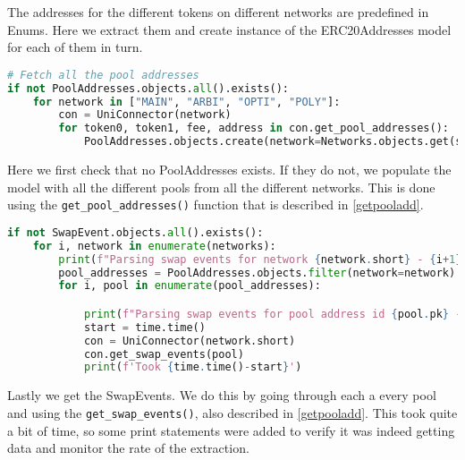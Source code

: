 The addresses for the different tokens on different networks are predefined in Enums. Here we extract them and create instance of the ERC20Addresses model for each of them in turn.


\begin{lstlisting}[language=python]
# Fetch all the pool addresses
if not PoolAddresses.objects.all().exists():
    for network in ["MAIN", "ARBI", "OPTI", "POLY"]:
        con = UniConnector(network)
        for token0, token1, fee, address in con.get_pool_addresses():
            PoolAddresses.objects.create(network=Networks.objects.get(short=network), token0=ERC20.objects.get(symbol=token0), token1=ERC20.objects.get(symbol=token1), fee_tier=fee.value, address=address)
\end{lstlisting}

Here we first check that no PoolAddresses exists. If they do not, we populate the model with all the different pools from all the different networks. This is done using the \texttt{get\_pool\_addresses()} function that is described in \ref{getpooladd}.


\begin{lstlisting}[language=python]
if not SwapEvent.objects.all().exists():
    for i, network in enumerate(networks):
        print(f"Parsing swap events for network {network.short} - {i+1} of {len(networks)}")
        pool_addresses = PoolAddresses.objects.filter(network=network)
        for i, pool in enumerate(pool_addresses):

            print(f"Parsing swap events for pool address id {pool.pk} - {i+1} of {len(pool_addresses)}")
            start = time.time()
            con = UniConnector(network.short)
            con.get_swap_events(pool)
            print(f'Took {time.time()-start}')
\end{lstlisting}

Lastly we get the SwapEvents. We do this by going through each a every pool and using the \texttt{get\_swap\_events()}, also described in \ref{getpooladd}. This took quite a bit of time, so some print statements were added to verify it was indeed getting data and monitor the rate of the extraction. 
